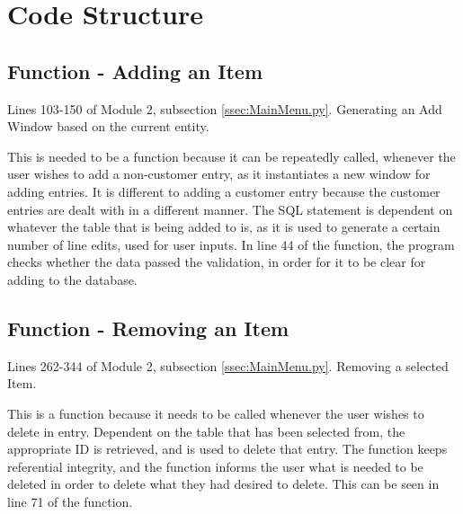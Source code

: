 \section{Code Structure}

\subsection{Function - Adding an Item}
Lines 103-150 of Module 2, subsection \ref{ssec:MainMenu.py}. Generating an Add Window based on the current entity.
\begin{tiny}
\end{tiny}
This is needed to be a function because it can be repeatedly called, whenever the user wishes to add a non-customer entry, as it instantiates a new window for adding entries. It is different to adding a customer entry because the customer entries are dealt with in a different manner. The SQL statement is dependent on whatever the table that is being added to is, as it is used to generate a certain number of line edits, used for user inputs. In line 44 of the function, the program checks whether the data passed the validation, in order for it to be clear for adding to the database.

\subsection{Function - Removing an Item}
Lines 262-344 of Module 2, subsection \ref{ssec:MainMenu.py}. Removing a selected Item.
\begin{tiny}
\end{tiny}
This is a function because it needs to be called whenever the user wishes to delete in entry. Dependent on the table that has been selected from, the appropriate ID is retrieved, and is used to delete that entry. The function keeps referential integrity, and the function informs the user what is needed to be deleted in order to delete what they had desired to delete. This can be seen in line 71 of the function.

